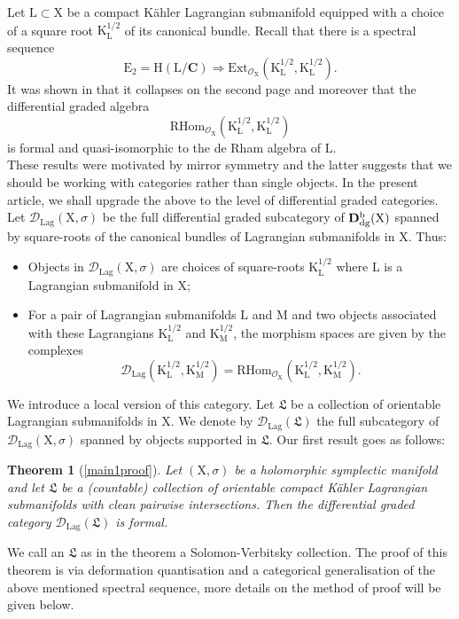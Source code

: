 \documentclass{article}
\theoremstyle{plain}
\newtheorem{theorem}{Theorem}[subsection]   %
\theoremstyle{definition}
\theoremstyle{remark}
\newcommand{\Db}{{\mathrm{\bf{D}}}^{\mr{b}}}
\newcommand{\mr}{\mathrm}
\newcommand{\C}{\mathbf C}
\newcommand{\3}{\vspace{3mm}}
\newcommand{\2}{\vspace{2mm}}
\newcommand{\1}{\vspace{1mm}}
\begin{document}
Let $\mr{L}\subset \mr{X}$ be a compact K\"{a}hler Lagrangian submanifold equipped with a choice of a square root $\mr{K}_\mr{L}^{1/2}$ of its canonical bundle. Recall that there is a spectral sequence $$\mr{E}_2=\mr{H}(\mr{L}/\C)\Rightarrow \mr{Ext}_{\mathscr{O}_\mr{X}}\left(\mr{K}_\mr{L}^{1/2},\mr{K}_\mr{L}^{1/2}\right).$$
It was shown in \cite{MR4678893} that it collapses on the second page and moreover that the differential graded algebra $$\mr{RHom}_{\mathscr{O}_\mr{X}}\left(\mr{K}_\mr{L}^{1/2},\mr{K}_\mr{L}^{1/2}\right)$$ is formal and quasi-isomorphic to the de Rham algebra of $\mr{L}$.\\
These results were motivated by mirror symmetry and the latter suggests that we should be working with categories rather than single objects. In the present article, we shall upgrade the above to the level of differential graded categories.\\
Let $\mathcal{D}_\mr{Lag}(\mr{X},\sigma)$ be the full differential graded subcategory of $\Db_\mr{dg}(\mr{X})$ spanned by square-roots of the canonical bundles of Lagrangian submanifolds in $\mr{X}$. Thus:
\begin{itemize}
\item Objects in $\mathcal{D}_\mr{Lag}(\mr{X},\sigma)$ are choices of square-roots $\mr{K}_\mr{L}^{1/2}$ where $\mr{L}$ is a Lagrangian submanifold in $\mr{X}$;
\item For a pair of Lagrangian submanifolds $\mr{L}$ and $\mr{M}$ and two objects associated with these Lagrangians $\mr{K}_\mr{L}^{1/2}$ and $\mr{K}_\mr{M}^{1/2}$, the morphism spaces are given by the complexes $$\mathcal{D}_\mr{Lag}\left(\mr{K}_\mr{L}^{1/2},\mr{K}_\mr{M}^{1/2}\right)=\mr{RHom}_{\mathscr{O}_\mr{X}}\left(\mr{K}_\mr{L}^{1/2},\mr{K}_\mr{M}^{1/2}\right).$$
\end{itemize}
We introduce a local version of this category. Let $\mathfrak{L}$ be a collection of orientable Lagrangian submanifolds in $\mr{X}$. We denote by $\mathcal{D}_\mr{Lag}(\mathfrak{L})$ the full subcategory of $\mathcal{D}_\mr{Lag}(\mr{X},\sigma)$ spanned by objects supported in $\mathfrak{L}$. Our first result goes as follows:
\2
\begin{theorem}[\cref{main1proof}]\label{main1}
Let $(\mr{X},\sigma)$ be a holomorphic symplectic manifold and let $\mathfrak{L}$ be a (countable) collection of orientable compact K\"{a}hler Lagrangian submanifolds with clean pairwise intersections. Then the differential graded category $\mathcal{D}_\mr{Lag}(\mathfrak{L})$ is formal.
\end{theorem}
We call an $\mathfrak{L}$ as in the theorem a Solomon-Verbitsky collection. The proof of this theorem is via deformation quantisation and a categorical generalisation of the above mentioned spectral sequence, more details on the method of proof will be given below.
 
\end{document}

